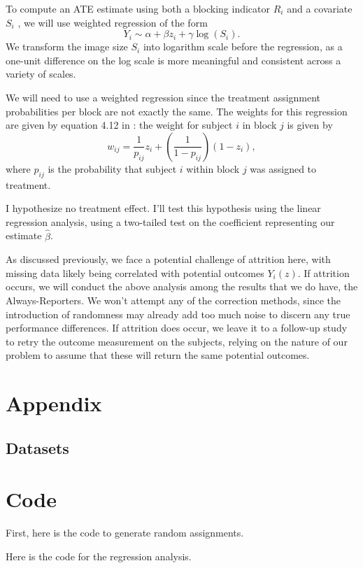 \documentclass[11pt, oneside]{article}
\begin{document}
To compute an ATE estimate using both a blocking indicator $R_i$ and a covariate $S_i$ , we
will use weighted regression of the form
\[
    Y_i \sim \alpha + \beta z_i + \gamma \log(S_i)
.\] 
We transform the image size $S_i$ into logarithm scale before the regression,
as a one-unit difference on the log scale is more meaningful and consistent
across a variety of scales.

We will need to use a weighted regression since the treatment assignment
probabilities per block are not exactly the same. The weights for this
regression are given by equation 4.12 in
\cite{gerberFieldExperimentsDesign2012}: the weight for subject $i$ in block
$j$ is given by
\[
    w_{ij} = \frac{1}{p_{ij}}z_i + (\frac{1}{1- p_{ij}})(1 - z_i)
,\] 
where $p_{ij}$ is the probability that subject $i$ within block $j$ was
assigned to treatment.

I hypothesize no treatment effect. I'll test this hypothesis using
the linear regression analysis, using a two-tailed test on the coefficient
representing our estimate $\hat{\beta}$.

As discussed previously, we face a potential challenge of attrition here, with
missing data likely being correlated with potential outcomes $Y_i(z)$. If
attrition occurs, we will conduct the above analysis among the results that we
do have, the Always-Reporters. We won't attempt any of the correction methods,
since the introduction of randomness may already add too much noise to discern
any true performance differences. If attrition does occur, we leave it to a
follow-up study to retry the outcome measurement on the subjects, relying on
the nature of our problem to assume that these will return the same potential
outcomes.

\newpage


\newpage

\section*{Appendix}

\subsection*{Datasets}




\newpage

\section*{Code}

First, here is the code to generate random assignments.



\newpage

Here is the code for the regression analysis.


\end{document}

